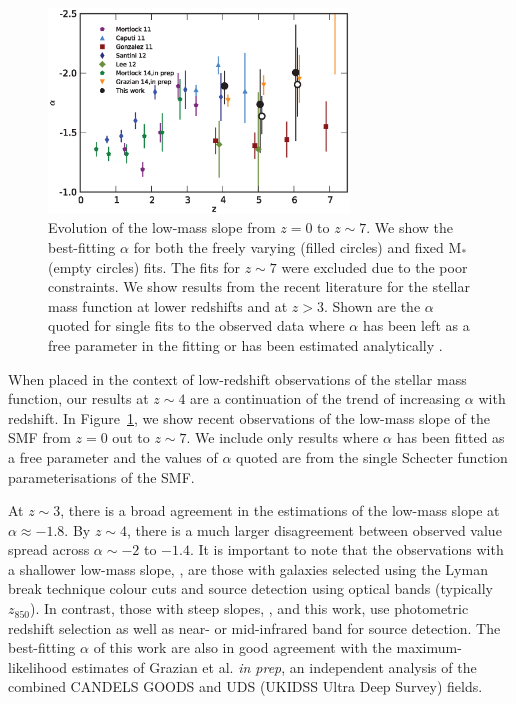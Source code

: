 \begin{figure}
\centering
\includegraphics[width=80mm]{plots/fig10.eps}
\caption{Evolution of the low-mass slope from $z = 0$ to $z \sim 7$. We show the best-fitting $\alpha$ for both the freely varying (filled circles) and fixed $\text{M}_{*}$ (empty circles) fits. The fits for $z\sim7$ were excluded due to the poor constraints. We show results from the recent literature for the stellar mass function at lower redshifts and at $z > 3$. Shown are the $\alpha$ quoted for single \citet{Schechter:1976gl} fits to the observed data where $\alpha$ has been left as a free parameter in the fitting or has been estimated analytically \citep{Gonzalez:2011dn}.}
\label{fig:alpha_evolution}
\end{figure}

When placed in the context of low-redshift observations of the stellar mass function, our results at $z \sim 4$ are a continuation of the trend of increasing $\alpha$ with redshift. In Figure~\ref{fig:alpha_evolution}, we show recent observations of the low-mass slope of the SMF from $z = 0$ out to $z \sim 7$. We include only results where $\alpha$ has been fitted as a free parameter and the values of $\alpha$ quoted are from the single Schecter function parameterisations of the SMF.

At $z \sim 3$, there is a broad agreement in the estimations of the low-mass slope at $\alpha \approx -1.8$. By $z \sim 4$, there is a much larger disagreement between observed value spread across $\alpha \sim -2$ to $-1.4$. It is important to note that the observations with a shallower low-mass slope, \citet{Gonzalez:2011dn,2012ApJ...752...66L}, are those with galaxies selected using the Lyman break technique colour cuts and source detection using optical bands (typically $z_{850}$). In contrast, those with steep slopes, \citet{2011MNRAS.413..162C}, \citet{Santini:2012jq} and this work, use photometric redshift selection as well as near- or mid-infrared band for source detection. The best-fitting $\alpha$ of this work are also in good agreement with the maximum-likelihood estimates of Grazian et al. \emph{in prep}, an independent analysis of the combined CANDELS GOODS and UDS (UKIDSS Ultra Deep Survey) fields. 


